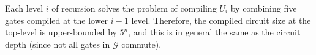 
Each level $i$ of recursion solves the problem of compiling 
$U_i$ by combining five gates compiled at the lower $i-1$ level.
Therefore, the compiled circuit size at the top-level is upper-bounded by $5^n$,
and
this is in general the same as the circuit depth (since not all gates in
$\mathcal{G}$ commute).

